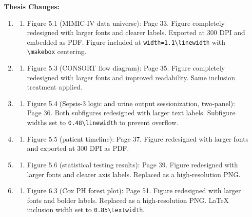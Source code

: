 \documentclass[12pt,a4paper]{article}
\begin{document}
\begin{flushleft}
\textbf{Thesis Changes:}
\begin{enumerate}
    \item
    \begin{enumerate}
        \item Figure 5.1 (MIMIC-IV data universe): Page 33. Figure completely redesigned with larger fonts and clearer labels. Exported at 300 DPI and embedded as PDF. Figure included at \texttt{width=1.1\textbackslash linewidth} with \texttt{\textbackslash makebox} centering.
    \end{enumerate}
    \item
    \begin{enumerate}
        \item Figure 5.3 (CONSORT flow diagram): Page 35. Figure completely redesigned with larger fonts and improved readability. Same inclusion treatment applied.
    \end{enumerate}
    \item
    \begin{enumerate}
        \item Figure 5.4 (Sepsis-3 logic and urine output sessionization, two-panel): Page 36. Both subfigures redesigned with larger text labels. Subfigure widths set to \texttt{0.48\textbackslash linewidth} to prevent overflow.
    \end{enumerate}
    \item
    \begin{enumerate}
        \item Figure 5.5 (patient timeline): Page 37. Figure redesigned with larger fonts and exported at 300 DPI as PDF.
    \end{enumerate}
    \item
    \begin{enumerate}
        \item Figure 5.6 (statistical testing results): Page 39. Figure redesigned with larger fonts and clearer axis labels. Replaced as a high-resolution PNG.
    \end{enumerate}
    \item
    \begin{enumerate}
        \item Figure 6.3 (Cox PH forest plot): Page 51. Figure redesigned with larger fonts and bolder labels. Replaced as a high-resolution PNG. LaTeX inclusion width set to \texttt{0.85\textbackslash textwidth}.
    \end{enumerate}
\end{enumerate}


\end{flushleft}
\end{document}
